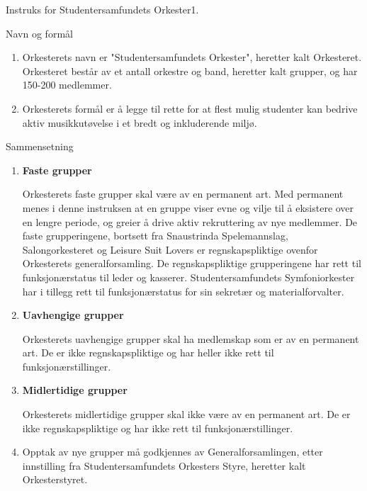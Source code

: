 
\begin{instruks}{Instruks for Studentersamfundets Orkester}{1. }{ }

\begin{instruksledd}{Navn og formål}
    \begin{enumerate}
        \item Orkesterets navn er "Studentersamfundets Orkester", heretter kalt Orkesteret.
Orkesteret består av et antall
orkestre og band, heretter kalt grupper, og har 150-200 medlemmer.
        \item Orkesterets formål er å legge til rette for at flest mulig studenter kan bedrive aktiv
musikkutøvelse i et bredt
og inkluderende miljø.
    \end{enumerate}
\end{instruksledd}

\begin{instruksledd}{Sammensetning}
    \begin{enumerate}

        \item \textbf{Faste grupper}

        Orkesterets faste grupper skal være av en permanent art. Med permanent menes i denne
instruksen at en
gruppe viser evne og vilje til å eksistere over en lengre periode, og greier å drive aktiv
rekruttering av nye
medlemmer. De faste grupperingene, bortsett fra Snaustrinda Spelemannslag, Salongorkesteret og
Leisure
Suit Lovers er regnskapspliktige ovenfor Orkesterets generalforsamling. De regnskapspliktige
grupperingene
har rett til funksjonærstatus til leder og kasserer. Studentersamfundets Symfoniorkester har i
tillegg rett til
funksjonærstatus for sin sekretær og materialforvalter.

        \item \textbf{Uavhengige grupper}

        Orkesterets uavhengige grupper skal ha medlemskap som er av en permanent art. De er ikke
regnskapspliktige og har heller ikke rett til funksjonærstillinger.

        \item \textbf{Midlertidige grupper}

        Orkesterets midlertidige grupper skal ikke være av en permanent art. De er ikke
regnskapspliktige og har
ikke rett til funksjonærstillinger.

        \item Opptak av nye grupper må godkjennes av Generalforsamlingen, etter innstilling fra
Studentersamfundets
Orkesters Styre, heretter kalt Orkesterstyret.


\end{enumerate}
\end{instruksledd}
\end{instruks}
